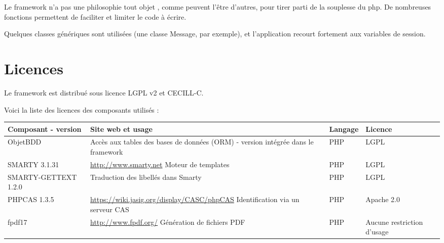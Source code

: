 Le framework n'a pas une philosophie \og tout objet \fg{}, comme peuvent l'être d'autres, pour tirer parti de la souplesse du php. De nombreuses fonctions permettent de faciliter et limiter le code à écrire.

Quelques classes génériques sont utilisées (une classe Message, par exemple), et l'application recourt fortement aux variables de session. 

\section{Licences}

Le framework est distribué sous licence LGPL v2 et CECILL-C.

Voici la liste des licences des composants utilisés :


\begin{longtable}{|>{\raggedright\arraybackslash}p{3cm}|p{6cm}|>{\raggedright\arraybackslash}p{1.5cm}|>{\raggedright\arraybackslash}p{1.5cm}|}
\hline
\textbf{Composant - version} & \textbf{Site web et usage} & \textbf{Langage} & \textbf{Licence} \\
\hline
\endhead
ObjetBDD &  Accès aux tables des bases de données (ORM) - version intégrée dans le framework & PHP & LGPL \\
\hline
SMARTY 3.1.31 & \url{http://www.smarty.net} Moteur de templates & PHP & LGPL \\
\hline
SMARTY-GETTEXT 1.2.0 & Traduction des libellés dans Smarty & PHP & LGPL \\
\hline


PHPCAS 1.3.5 & \url{https://wiki.jasig.org/display/CASC/phpCAS} Identification via un serveur CAS & PHP & Apache 2.0\\
\hline
fpdf17 & \url{http://www.fpdf.org/} Génération de fichiers PDF & PHP & Aucune restriction d'usage\\
\hline


\end{longtable}
